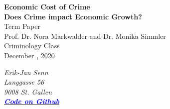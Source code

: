 \documentclass[a4paper,12pt]{article}
\begin{document}



\begin{titlepage}       %

\thispagestyle{empty}   %


\begin{center}
\vspace*{2.5cm}
{\bf  \Large   Economic Cost of Crime }\\
\vspace*{1cm} 
{\bf  \Large   Does Crime impact Economic Growth?}\\
\vspace*{3cm} 
Term Paper\\
Prof. Dr. Nora Markwalder and Dr. Monika Simmler
\\ Criminology Class\\

\vspace*{0.5cm} 
December , 2020\\
\end{center}

\vfill
\begin{flushright}
   \emph{Erik-Jan Senn} \\
    \emph{Langgasse 56}\\
    \emph{9008 St. Gallen}\\
    \emph{\href{https://github.com/DrWatson42/crime_on_gdp}{\textbf{\textcolor{blue}{Code on Github} }}}

\end{flushright}



% 
% 
% 

\end{titlepage}

\newpage                %




\end{document}
